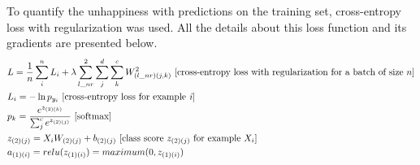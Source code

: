 \documentclass{article}
\begin{document}
  To quantify the unhappiness with predictions on the training set, cross-entropy loss with regularization was used. All the details about this loss function and its gradients are presented below.
  \begin{align*}
    &L = \frac{1}{n} \sum_{i}^{n} L_{i} 
          + \lambda \sum_{l\_nr}^{2} \sum_{j}^{d} \sum_{k}^{c} W_{(l\_nr)(j,k)}^{2} \text{ [cross-entropy loss with regularization for a batch of size $n$]}\\
    &L_{i} = -\ln{p_{y_{i}}} \text{ [cross-entropy loss for example \textit{i}]}\\
    &p_{k} = \frac {e^{z_{(2)(k)}}}{\sum_{j}^{c} e^{z_{(2)(j)}}} \text{ [softmax]}\\
    &z_{(2)(j)} = X_{i}W_{(2)(j)} + b_{(2)(j)} \text{ [class score $z_{(2)(j)}$ for example $X_{i}$]}\\
    &a_{(1)(i)} = relu(z_{(1)(i)}) = maximum(0, z_{(1)(i)})
  \end{align*}
  
\end{document}
